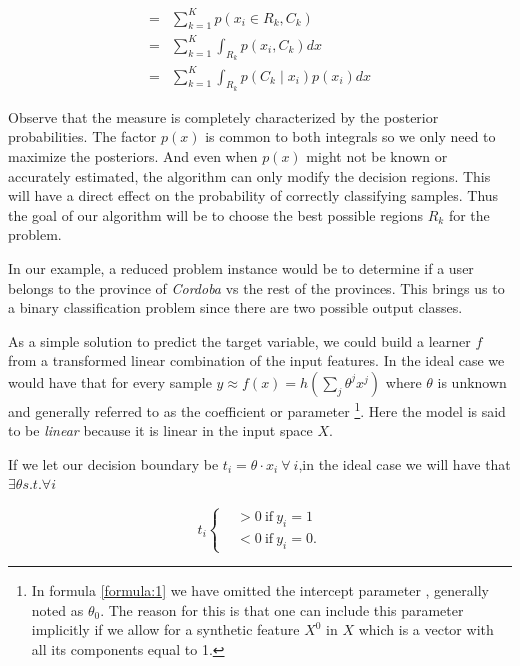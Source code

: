 \begin{equation}\label{eq:goodclassification-equation}
\begin{split}
=  & \sum_{k=1}^{K} p(x_i \in R_k, C_k )  \\
=  & \sum_{k=1}^{K} \int_{R_k}p(x_i,C_k) dx \\
=  & \sum_{k=1}^{K} \int_{R_k}p(C_k \mid x_i) p(x_i) dx
\end{split}
\end{equation}

Observe that the measure is completely characterized by the posterior probabilities. The factor $p(x)$ is common to both integrals so we only need to maximize the posteriors. And even when $p(x)$ might not be known or accurately estimated, the algorithm can only modify the decision regions. This will have a direct effect on the probability of correctly classifying samples. Thus the goal of our algorithm will be to choose the best possible regions $R_k$ for the problem.

In our example, a reduced problem instance would be to determine if a user belongs to the province of \textit{Cordoba} vs the rest of the provinces. This brings us to a binary classification problem since there are two possible output classes. %

As a simple solution to predict the target variable, we could build a learner $f$ from a transformed linear combination of the input features. In the ideal case we would have that for every sample $y \approx f(x) = h\left(\sum_{j}\theta^jx^j\right)$ \label{formula:1} where $\theta$ is unknown and generally referred to as the coefficient or parameter \footnote{In formula \ref{formula:1} we have omitted the intercept parameter , generally noted as $\theta_0$. The reason for this is that one can include this parameter implicitly if we allow for a synthetic feature $X^0$ in $X$ which is a vector with all its components equal to 1.  }. Here the model is said to be \textit{linear} because it is linear in the input space $X$.

If we let our decision boundary be $ t_i = \theta \cdot x_i  \ \forall \ i $,in the ideal case we will have that $\exists \theta s.t. \forall i $

\begin{equation}
t_i
\begin{cases}
&>0 \ \mbox{if} \ y_i=1 \\
&<0 \ \mbox{if} \ y_i=0.
\end{cases}
\end{equation}


